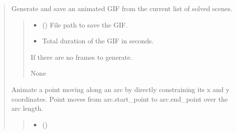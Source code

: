 \documentclass[letterpaper,10pt,english]{sphinxmanual}
\begin{document}
\begin{quote}
\begin{fulllineitems}
\begin{fulllineitems}
\label{\detokenize{pygeox:pygeox.animate.AnimateNamespace.gif}}
\pysigstartsignatures
\pysiglinewithargsret
{}
{}
{}
\pysigstopsignatures
\sphinxAtStartPar
Generate and save an animated GIF from the current list of solved scenes.
\begin{quote}\begin{description}
\begin{itemize}
\item {} 
\sphinxAtStartPar
{} () \textendash{} File path to save the GIF.

\item {} 
\sphinxAtStartPar
{} \textendash{} Total duration of the GIF in seconds.

\end{itemize}

\sphinxAtStartPar
{} \textendash{} If there are no frames to generate.

\sphinxAtStartPar
None

\end{description}\end{quote}

\end{fulllineitems}


\begin{fulllineitems}
\label{\detokenize{pygeox:pygeox.animate.AnimateNamespace.point_sweep_arc}}
\pysigstartsignatures
\pysiglinewithargsret
{}
{\sphinxparamcomma {}\sphinxparamcomma {}\sphinxparamcomma {}\sphinxparamcomma {}}
{}
\pysigstopsignatures
\sphinxAtStartPar
Animate a point moving along an arc by directly constraining its x and y coordinates.
Point moves from arc.start\_point to arc.end\_point over the arc length.
\begin{quote}\begin{description}
\begin{itemize}
\item {} 
\sphinxAtStartPar
{} ()


\end{itemize}
\end{description}
\end{quote}
\end{fulllineitems}
\end{fulllineitems}
\end{quote}
\end{document}
